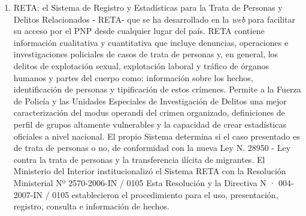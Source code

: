 \documentclass{article}
\begin{document}
\begin{enumerate}
\item RETA: el Sistema de Registro y Estadísticas para la Trata de Personas y Delitos Relacionados - RETA- que se ha desarrollado en la \emph{web} para facilitar su acceso por el PNP desde cualquier lugar del país. RETA contiene información cualitativa y cuantitativa que incluye denuncias, operaciones e investigaciones policiales de casos de trata de personas y, en general, los delitos de explotación sexual, explotación laboral y tráfico de órganos humanos y partes del cuerpo como: información sobre los hechos, identificación de personas y tipificación de estos crímenes. Permite a la Fuerza de Policía y las Unidades Especiales de Investigación de Delitos una mejor caracterización del modus operandi del crimen organizado, definiciones de perfil de grupos altamente vulnerables y la capacidad de crear estadísticas oficiales a nivel nacional. El propio Sistema determina si el caso presentado es de trata de personas o no, de conformidad con la nueva Ley N. 28950 - Ley contra la trata de personas y la transferencia ilícita de migrantes. El Ministerio del Interior institucionalizó el Sistema RETA con la Resolución Ministerial Nº 2570-2006-IN / 0105 Esta Resolución y la Directiva N · 004-2007-IN / 0105 establecieron el procedimiento para el uso, presentación, registro, consulta e información de hechos.


\end{enumerate}
\end{document}
